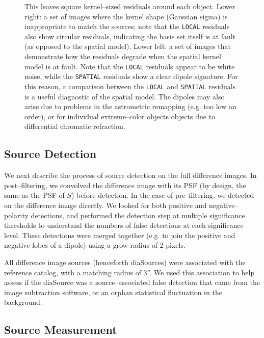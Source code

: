 \documentclass[floatfix, apj]{emulateapj}
\begin{document}
\begin{figure}[!ht]
{  This leaves square kernel--sized residuals around each object.
  Lower right: a set of images where the kernel shape (Gaussian sigma) is inappropriate to match the sources; 
  note that the {\tt LOCAL} residuals also show circular residuals, indicating the basis set itself is at fault (as opposed to the spatial model).
  Lower left: a set of images that demonstrate how the residuals degrade when the spatial kernel model is at fault.
  Note that the {\tt LOCAL} residuals appear to be white noise, while the {\tt SPATIAL} residuals show a clear dipole signature.
  For this reason, a comparison between the {\tt LOCAL} and {\tt SPATIAL} residuals is a useful diagnostic of the spatial model.
  The dipoles may also arise due to problems in the astrometric remapping (e.g. too low an order), or for individual extreme--color objects objects due to differential chromatic refraction.
}
\label{fig:1}
\end{figure}


\subsection{Source Detection}

We next describe the process of source detection on the full difference images.
In post--filtering, we convolved the difference image with its PSF (by design, the same as the PSF of $S$) before detection.
In the case of pre--filtering, we detected on the difference image directly.
We looked for both positive and negative--polarity detections, and performed the detection step at multiple significance thresholds to understand the numbers of false detections at each significance level.
These detections were merged together (e.g. to join the positive and negative lobes of a dipole) using a grow radius of 2 pixels.


All difference image sources (henceforth diaSources) were associated with the reference catalog, with a matching radius of 3''.
We used this association to help assess if the diaSource was a source--associated false detection that came from the image subtraction software, or an orphan statistical fluctuation in the background.

\subsection{Source Measurement}
\end{document}
